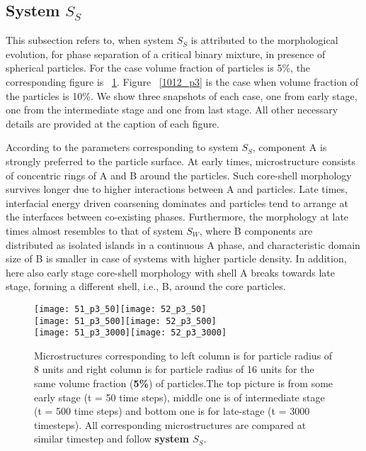 \documentclass[12pt]{iiscthes}
\theoremstyle{definition}
\theoremstyle{definition}
\theoremstyle{remark}
\begin{document}
\subsection{System $S_S$}
This subsection refers to, when system $S_S$ is attributed to the morphological evolution, for phase separation of a critical binary mixture, in presence of spherical particles. For the case volume fraction of particles is 5\%, the corresponding figure is ~\ref{512_p3}. Figure ~\ref{1012_p3} is the case when volume fraction of the particles is 10\%.  We show three snapshots of each case, one from early stage, one from the intermediate stage and one from last stage. All other necessary details are provided at the caption of each figure.

According to the parameters corresponding to system $S_S$, component A is strongly preferred to the particle surface. At early times, microstructure consists of concentric rings of A and B around the particles. Such core-shell morphology survives longer due to higher interactions between A and particles. Late times, interfacial energy driven coarsening dominates and particles tend to arrange at the interfaces between co-existing phases. Furthermore, the morphology at late times almost resembles to that of system $S_W$, where B components are distributed as isolated islands in a continuous A phase, and characteristic domain size of B is smaller in case of systems with higher particle density. In addition, here also early stage core-shell morphology with shell A breaks towards late stage, forming a different shell, i.e., B, around the core particles.
\newpage
 \begin{figure}[H]
\begin{center}
\texttt{[image: 51\_p3\_50]}\texttt{[image: 52\_p3\_50]}\\
\texttt{[image: 51\_p3\_500]}\texttt{[image: 52\_p3\_500]}\\
\texttt{[image: 51\_p3\_3000]}\texttt{[image: 52\_p3\_3000]}\\
\caption{Microstructures corresponding to left column is for particle radius of 8 units and right column is for particle radius of 16 units for the same volume fraction (\textbf{5\%}) of particles.The top picture is from some early stage (t = 50 time steps), middle one is of intermediate stage (t = 500 time steps) and bottom one is for late-stage (t = 3000 timesteps). All corresponding microstructures are compared at similar timestep and follow \textbf{system $S_S$}.}\label{512_p3}
\end{center}
\end{figure}
\end{document}
